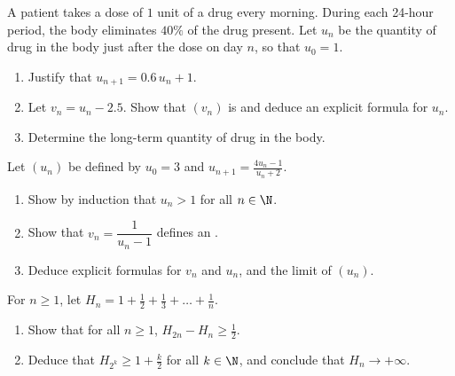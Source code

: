 \begin{exercise}[$\star\star$]\label{exo:g12:seq:7}
A patient takes a dose of $1$ unit of a drug every morning. During each
24-hour period, the body eliminates $40\%$ of the drug present. Let $u_n$ be
the quantity of drug in the body just after the dose on day $n$, so that
$u_0 = 1$.
\begin{enumerate}
  \item Justify that $u_{n+1} = 0.6\,u_n + 1$.
  \item Let $v_n = u_n - 2.5$. Show that $(v_n)$ is  and deduce an
        explicit formula for $u_n$.
  \item Determine the long-term quantity of drug in the body.
\end{enumerate}
\end{exercise}

\begin{exercise}[$\star\star$]\label{exo:g12:seq:8}
Let $(u_n)$ be defined by $u_0 = 3$ and $u_{n+1} = \frac{4u_n - 1}{u_n + 2}$.
\begin{enumerate}
  \item Show by induction that $u_n > 1$ for all $n \in \N$.
  \item Show that $v_n = \dfrac{1}{u_n - 1}$ defines an .
  \item Deduce explicit formulas for $v_n$ and $u_n$, and the limit of
        $(u_n)$.
\end{enumerate}
\end{exercise}

\begin{exercise}[$\star\star\star$]\label{exo:g12:seq:9}
For $n \geq 1$, let
$H_n = 1 + \frac{1}{2} + \frac{1}{3} + \dots + \frac{1}{n}$.
\begin{enumerate}
  \item Show that for all $n \geq 1$, $H_{2n} - H_n \geq \frac{1}{2}$.
  \item Deduce that $H_{2^k} \geq 1 + \frac{k}{2}$ for all $k \in \N$, and
        conclude that $H_n \to +\infty$.
\end{enumerate}
\end{exercise}

